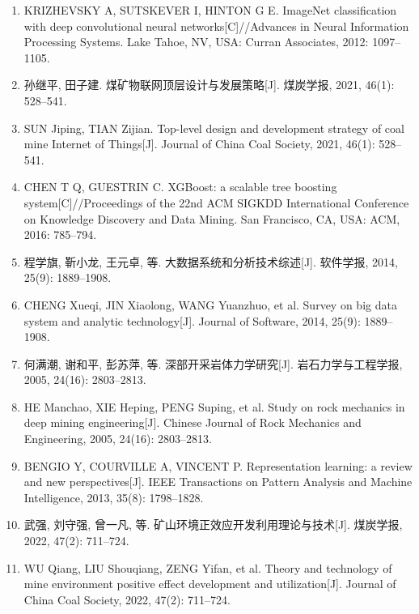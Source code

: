 \documentclass[twocolumn,a4paper]{ctexart}
\numberwithin{equation}{section}
\begin{document}
\begin{flushleft}
\begin{enumerate}
\item[{[16]}] KRIZHEVSKY A, SUTSKEVER I, HINTON G E. ImageNet classification with deep convolutional neural networks[C]//Advances in Neural Information Processing Systems. Lake Tahoe, NV, USA: Curran Associates, 2012: 1097--1105.

\item[{[17]}] 孙继平, 田子建. 煤矿物联网顶层设计与发展策略[J]. 煤炭学报, 2021, 46(1): 528--541.

\item[] SUN Jiping, TIAN Zijian. Top-level design and development strategy of coal mine Internet of Things[J]. Journal of China Coal Society, 2021, 46(1): 528--541.

\item[{[18]}] CHEN T Q, GUESTRIN C. XGBoost: a scalable tree boosting system[C]//Proceedings of the 22nd ACM SIGKDD International Conference on Knowledge Discovery and Data Mining. San Francisco, CA, USA: ACM, 2016: 785--794.

\item[{[19]}] 程学旗, 靳小龙, 王元卓, 等. 大数据系统和分析技术综述[J]. 软件学报, 2014, 25(9): 1889--1908.

\item[] CHENG Xueqi, JIN Xiaolong, WANG Yuanzhuo, et al. Survey on big data system and analytic technology[J]. Journal of Software, 2014, 25(9): 1889--1908.

\item[{[20]}] 何满潮, 谢和平, 彭苏萍, 等. 深部开采岩体力学研究[J]. 岩石力学与工程学报, 2005, 24(16): 2803--2813.

\item[] HE Manchao, XIE Heping, PENG Suping, et al. Study on rock mechanics in deep mining engineering[J]. Chinese Journal of Rock Mechanics and Engineering, 2005, 24(16): 2803--2813.

\item[{[21]}] BENGIO Y, COURVILLE A, VINCENT P. Representation learning: a review and new perspectives[J]. IEEE Transactions on Pattern Analysis and Machine Intelligence, 2013, 35(8): 1798--1828.

\item[{[22]}] 武强, 刘守强, 曾一凡, 等. 矿山环境正效应开发利用理论与技术[J]. 煤炭学报, 2022, 47(2): 711--724.

\item[] WU Qiang, LIU Shouqiang, ZENG Yifan, et al. Theory and technology of mine environment positive effect development and utilization[J]. Journal of China Coal Society, 2022, 47(2): 711--724.


\end{enumerate}
\end{flushleft}
\end{document}
